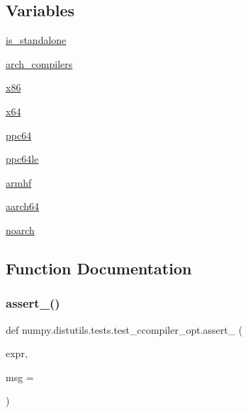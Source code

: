 \subsection*{Variables}
\begin{DoxyCompactItemize}
\item 
\hyperlink{namespacenumpy_1_1distutils_1_1tests_1_1test__ccompiler__opt_a63e3908d2019edc1e69ac20f572fbe01}{is\+\_\+standalone}
\item 
\hyperlink{namespacenumpy_1_1distutils_1_1tests_1_1test__ccompiler__opt_acb3fa218d22d44dcb0047dd71e0281f2}{arch\+\_\+compilers}
\item 
\hyperlink{namespacenumpy_1_1distutils_1_1tests_1_1test__ccompiler__opt_af597cb9e7bebb1bda72baf463a4e21e4}{x86}
\item 
\hyperlink{namespacenumpy_1_1distutils_1_1tests_1_1test__ccompiler__opt_a947f4c025ae928810a59d64d8838a10d}{x64}
\item 
\hyperlink{namespacenumpy_1_1distutils_1_1tests_1_1test__ccompiler__opt_a2422132b3cbc62993de0d74e8d4e2b63}{ppc64}
\item 
\hyperlink{namespacenumpy_1_1distutils_1_1tests_1_1test__ccompiler__opt_aa60212bfd8aa558aff4458090a897a2f}{ppc64le}
\item 
\hyperlink{namespacenumpy_1_1distutils_1_1tests_1_1test__ccompiler__opt_a5567aa4981c96de994f31fb22cb3a263}{armhf}
\item 
\hyperlink{namespacenumpy_1_1distutils_1_1tests_1_1test__ccompiler__opt_a0d17f6afc7bfbc7a5db1bb6ccfa794a1}{aarch64}
\item 
\hyperlink{namespacenumpy_1_1distutils_1_1tests_1_1test__ccompiler__opt_ad095c03401bb03fb053e233e46dc6d87}{noarch}
\end{DoxyCompactItemize}


\subsection{Function Documentation}
\mbox{\label{namespacenumpy_1_1distutils_1_1tests_1_1test__ccompiler__opt_a2039c1c6d64584c7c23a8161cdf2e020}} 
\subsubsection{\texorpdfstring{assert\+\_\+()}{assert\_()}}
{\footnotesize\ttfamily def numpy.\+distutils.\+tests.\+test\+\_\+ccompiler\+\_\+opt.\+assert\+\_\+ (\begin{DoxyParamCaption}\item[{}]{expr,  }\item[{}]{msg = {\ttfamily \textquotesingle{}\textquotesingle{}} }\end{DoxyParamCaption})}

